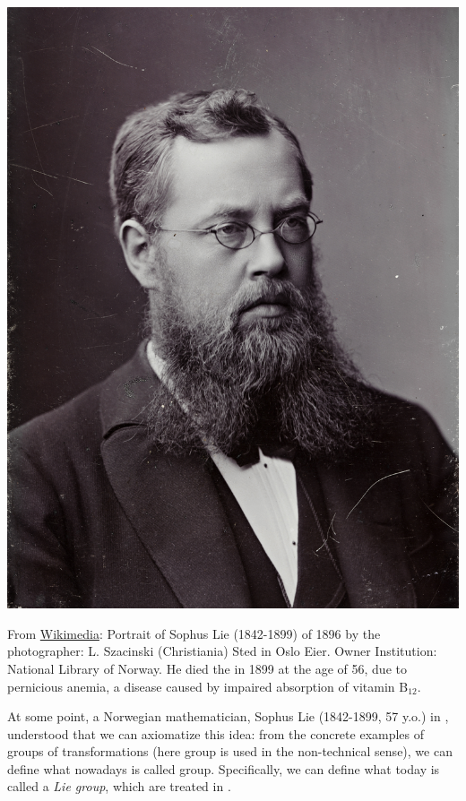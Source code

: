 \documentclass[../main.tex]{subfiles}
\begin{document}
\begin{marginfigure}[-2mm]
	\includegraphics[width=1\linewidth]{images/Portrett_av_Sophus_Lie.jpg}
	\caption[Photo of Lie]{From \href{https://commons.wikimedia.org/wiki/File:Portrett_av_Sophus_Lie.jpg}{Wikimedia}: Portrait of Sophus Lie (1842-1899) of 1896 by the photographer: L. Szacinski (Christiania) Sted in Oslo Eier. Owner Institution: National Library of Norway. He died the in 1899 at the age of 56, due to pernicious anemia, a disease caused by impaired absorption of vitamin $\textrm{B}_{12}$.}
\end{marginfigure}
At some point, a Norwegian mathematician, Sophus Lie (1842-1899, 57 y.o.) in , understood that we can axiomatize this idea: from the concrete examples of groups of transformations (here group is used in the non-technical sense), we can define what nowadays is called group. Specifically, we can define what today is called a \textit{Lie group}, which are treated in .
\end{document}

